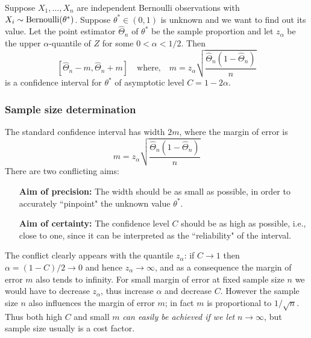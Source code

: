 \begin{prop}
\label{prop-asy-confid-level-two-sided}Suppose 
$X_{1},\ldots ,X_{n}$ are independent Bernoulli observations with $X_{i}\sim \mbox{{\rm Bernoulli}}(\theta^*)$.  
Suppose $\theta^*\in (0,1)$ is unknown and we want to find out its value. 
Let the point estimator $\widehat{\Theta}_{n}$ of $\theta^*$ be the sample proportion and let $%
z_{\alpha}$ be the upper $\alpha $-quantile of $Z$ for some $%
0<\alpha <1/2$. Then 
\begin{equation*}
 \left[ \widehat{\Theta}_{n}-m,\widehat{\Theta}_{n}+m\right] \quad \text{where,} \quad m=z_{\alpha}\sqrt{\frac{\widehat{\Theta}_{n}(1-\widehat{\Theta}_{n})}{n}}
\end{equation*}%
is a confidence interval for $\theta^*$ of asymptotic level $C=1-2\alpha $.
\end{prop}

\subsubsection{Sample size determination}

The standard confidence interval has width $2m$, where the margin of error
is 
\begin{equation}
m=z_{\alpha}\sqrt{\frac{\widehat{\Theta}_{n}(1-\widehat{\Theta}_{n})}{n}}
\label{standard-margin-a}
\end{equation}
There are two conflicting aims:

\begin{itemize}
\item[{\bf Aim of precision:}] The width should be as small as possible, in order to accurately ``pinpoint" the unknown value $\theta^*$.

\item[{\bf Aim of certainty:}] The confidence level $C$ should be as high as possible, i.e., close to one, since it can be interpreted as the ``reliability" of the interval.
\end{itemize}

The conflict clearly appears with the quantile $z_{\alpha}$: if $%
C\rightarrow 1$ then $\alpha =\left( 1-C\right) /2\rightarrow 0$ and hence $%
z_{\alpha}\rightarrow \infty $, and as a consequence the margin of
error $m$ also tends to infinity. For small margin of error at fixed sample
size $n$ we would have to decrease $z_{\alpha}$, thus increase $%
\alpha $ and decrease $C$. However the sample size $n$ also influences the
margin of error $m$; in fact $m$ is proportional to $1/\sqrt{n}$. Thus both
high $C$ and small $m$ \textit{can easily be achieved if we let }$%
n\rightarrow \infty $, but sample size usually is a cost factor.

